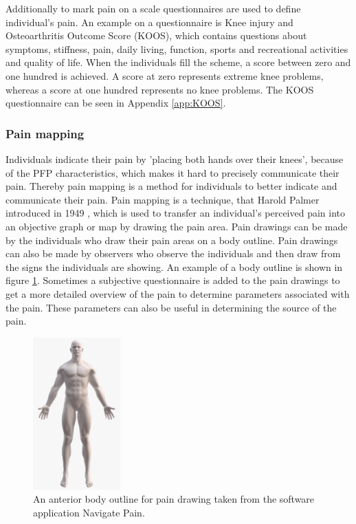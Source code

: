 \noindent
Additionally to mark pain on a scale questionnaires are used to define individual's pain. An example on a questionnaire is Knee injury and Osteoarthritis Outcome Score (KOOS), which contains questions about symptoms, stiffness, pain, daily living, function, sports and recreational activities and quality of life. When the individuals fill the scheme, a score between zero and one hundred is achieved. A score at zero represents extreme knee problems, whereas a score at one hundred represents no knee problems.\citep{Roos2003} The KOOS questionnaire can be seen in Appendix \ref{app:KOOS}. 
\noindent 


\subsubsection{Pain mapping}
Individuals indicate their pain by 'placing both hands over their knees', because of the PFP characteristics, which makes it hard to precisely communicate their pain. Thereby pain mapping is a method for individuals to better indicate and communicate their pain. 
\noindent
Pain mapping is a technique, that Harold Palmer introduced in 1949 \citep{Grunnesjo2006}, which is used to transfer an individual's perceived pain into an objective graph or map by drawing the pain area. Pain drawings can be made by the individuals who draw their pain areas on a body outline. Pain drawings can also be made by observers who observe the individuals and then draw from the signs the individuals are showing. An example of a body outline is shown in figure \ref{fig:painmap}. Sometimes a subjective questionnaire is added to the pain drawings to get a more detailed overview of the pain to determine parameters associated with the pain. These parameters can also be useful in determining the source of the pain.\citep{Schott2010}

\begin{figure} [H]
\centering
\includegraphics[width=0.3\textwidth]{figures/painmap}
\caption{An anterior body outline for pain drawing taken from the software application Navigate Pain.}
\label{fig:painmap}
\end{figure}

